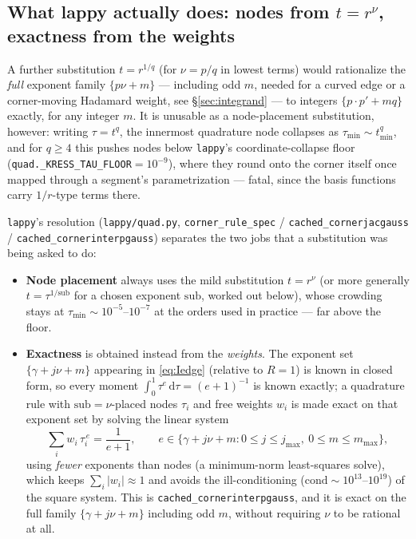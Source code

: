 \documentclass[11pt]{article}
\theoremstyle{remark}
\newcommand{\dd}{\,\mathrm{d}}
\newcommand{\code}[1]{\texttt{#1}}
\begin{document}
\subsection{What lappy actually does: nodes from $t=r^\nu$, exactness from the weights}\label{sec:sub2}

A further substitution $t=r^{1/q}$ (for $\nu=p/q$ in lowest terms) would rationalize the
\emph{full} exponent family $\{p\nu+m\}$ --- including odd $m$, needed for a curved edge or a
corner-moving Hadamard weight, see \S\ref{sec:integrand} --- to integers $\{p\cdot p'+m q\}$
exactly, for any integer $m$. It is unusable as a node-placement substitution, however: writing
$\tau=t^q$, the innermost quadrature node collapses as $\tau_{\min}\sim t_{\min}^q$, and for
$q\ge4$ this pushes nodes below \code{lappy}'s coordinate-collapse floor
(\code{quad.\_KRESS\_TAU\_FLOOR}$=10^{-9}$), where they round onto the corner itself once mapped
through a segment's parametrization --- fatal, since the basis functions carry $1/r$-type terms
there.

\code{lappy}'s resolution (\code{lappy/quad.py}, \code{corner\_rule\_spec} /
\code{cached\_cornerjacgauss} / \code{cached\_cornerinterpgauss}) separates the two jobs that a
substitution was being asked to do:

\begin{itemize}
\item \textbf{Node placement} always uses the mild substitution $t=r^\nu$ (or more generally
$t=\tau^{1/\mathrm{sub}}$ for a chosen exponent $\mathrm{sub}$, worked out below), whose crowding
stays at $\tau_{\min}\sim10^{-5}$--$10^{-7}$ at the orders used in practice --- far above the
floor.
\item \textbf{Exactness} is obtained instead from the \emph{weights}. The exponent set
$\{\gamma+j\nu+m\}$ appearing in \eqref{eq:Iedge} (relative to $R=1$) is known in closed form, so
every moment $\int_0^1 \tau^{e}\dd\tau=(e+1)^{-1}$ is known exactly; a quadrature rule with
$\mathrm{sub}=\nu$-placed nodes $\tau_i$ and free weights $w_i$ is made exact on that exponent set
by solving the linear system
\begin{equation}\label{eq:weightsolve}
  \sum_i w_i\,\tau_i^{\,e} = \frac{1}{e+1}, \qquad e \in \{\gamma+j\nu+m : 0\le j\le j_{\max},\ 0\le m\le m_{\max}\},
\end{equation}
using \emph{fewer} exponents than nodes (a minimum-norm least-squares solve), which keeps
$\sum_i|w_i|\approx1$ and avoids the ill-conditioning ($\mathrm{cond}\sim10^{13}$--$10^{19}$) of
the square system. This is \code{cached\_cornerinterpgauss}, and it is exact on the full family
$\{\gamma+j\nu+m\}$ including odd $m$, without requiring $\nu$ to be rational at all.
\end{itemize}
\end{document}
